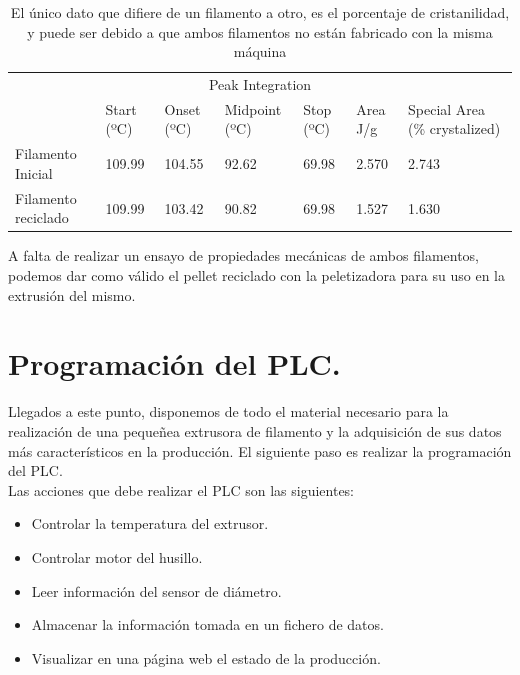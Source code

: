 \begin{table}[H]
    \centering
    \begin{tabular}{lllllll}
        \multicolumn{7}{c}{Peak Integration}                                                                                 \\
                            & Start (ºC) & Onset (ºC) & Midpoint (ºC) & Stop (ºC) & Area J/g & Special Area (\% crystalized) \\ \hline
        Filamento Inicial   & 109.99     & 104.55     & 92.62         & 69.98     & 2.570    & 2.743                         \\
        Filamento reciclado & 109.99     & 103.42     & 90.82         & 69.98     & 1.527    & 1.630                        
    \end{tabular}
    \caption[Datos del DSC con la cristanilidad del filamento]{El único dato que difiere de un filamento a otro, es el porcentaje de cristanilidad, y puede ser debido a que ambos filamentos no están fabricado con la misma máquina}
    \label{tab:dsc2}
\end{table}

A falta de realizar un ensayo de propiedades mecánicas de ambos filamentos, podemos dar como válido el pellet reciclado con la peletizadora para su uso en la extrusión del mismo.

\section{Programación del PLC.}

Llegados a este punto, disponemos de todo el material necesario para la realización de una pequeñea extrusora de filamento y la adquisición de sus datos más característicos en la producción. El siguiente paso es realizar la programación del PLC.\\

Las acciones que debe realizar el PLC son las siguientes:

\begin{itemize}
    \item{Controlar la temperatura del extrusor.}
    \item{Controlar motor del husillo.}
    \item{Leer información del sensor de diámetro.}
    \item{Almacenar la información tomada en un fichero de datos.}
    \item{Visualizar en una página web el estado de la producción.}
\end{itemize}

